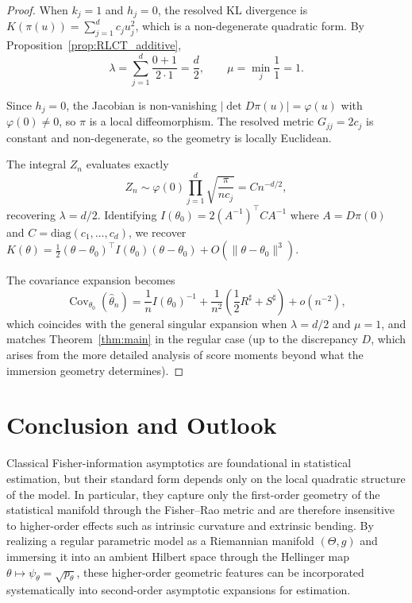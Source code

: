 \documentclass[11pt,letterpaper]{amsart}
\DeclareMathOperator{\Cov}{Cov}
\numberwithin{equation}{section}
\theoremstyle{plain}
\theoremstyle{definition}
\theoremstyle{remark}
\begin{document}
\begin{proof}
When $k_j = 1$ and $h_j = 0$, the resolved KL divergence is $K(\pi(u)) = \sum_{j=1}^d c_j u_j^2$, which is a non-degenerate quadratic form. By Proposition~\ref{prop:RLCT_additive},
\[
\lambda = \sum_{j=1}^d \frac{0+1}{2 \cdot 1} = \frac{d}{2}, \qquad \mu = \min_j \frac{1}{1} = 1.
\]

Since $h_j = 0$, the Jacobian is non-vanishing $|\det D\pi(u)| = \varphi(u)$ with $\varphi(0) \neq 0$, so $\pi$ is a local diffeomorphism. The resolved metric $G_{jj} = 2c_j$ is constant and non-degenerate, so the geometry is locally Euclidean.

The integral $Z_n$ evaluates exactly
\[
Z_n \sim \varphi(0) \prod_{j=1}^d \sqrt{\frac{\pi}{nc_j}} = C n^{-d/2},
\]
recovering $\lambda = d/2$. Identifying $I(\theta_0) = 2(A^{-1})^\top C A^{-1}$ where $A = D\pi(0)$ and $C = \mathrm{diag}(c_1,\ldots,c_d)$, we recover
$K(\theta) = \frac{1}{2}(\theta-\theta_0)^\top I(\theta_0)(\theta-\theta_0) + O(\|\theta-\theta_0\|^3)$.

The covariance expansion becomes
\[
\Cov_{\theta_0}(\hat\theta_n)
=
\frac{1}{n}I(\theta_0)^{-1}
+
\frac{1}{n^2}\left(\frac{1}{2}R^\sharp + S^\sharp\right)
+o(n^{-2}),
\]
which coincides with the general singular expansion when $\lambda = d/2$ and $\mu = 1$, and matches Theorem~\ref{thm:main} in the regular case (up to the discrepancy $D$, which arises from the more detailed analysis of score moments beyond what the immersion geometry determines).
\end{proof}



\section{Conclusion and Outlook}\label{sec:conclusion}

Classical Fisher-information asymptotics are foundational in statistical estimation, but their standard form depends only on the local quadratic structure of the model. In particular, they capture only the first-order geometry of the statistical manifold through the Fisher--Rao metric and are therefore insensitive to higher-order effects such as intrinsic curvature and extrinsic bending. By realizing a regular parametric model as a Riemannian manifold \((\Theta,g)\) and immersing it into an ambient Hilbert space through the Hellinger map \(\theta\mapsto\psi_\theta=\sqrt{p_\theta}\), these higher-order geometric features can be incorporated systematically into second-order asymptotic expansions for estimation.
\end{document}
